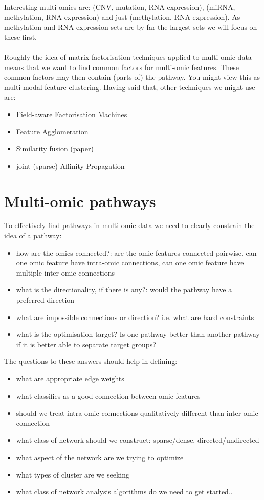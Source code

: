 \documentclass[a4paper,10pt]{article}
\begin{document}
Interesting multi-omics are: (CNV, mutation, RNA expression), (miRNA, methylation, RNA expression) and just (methylation, RNA expression).
As methylation and RNA expression sets are by far the largest sets we will focus on these first. \\ \\
%
Roughly the idea of matrix factorisation techniques applied to multi-omic data means that we want to find
common factors for multi-omic features. These common factors may then contain (parts of) the pathway. 
You might view this as multi-modal feature clustering. Having said that, other techniques we might use are:
\begin{itemize}
\item Field-aware Factorisation Machines
\item Feature Agglomeration
\item Similarity fusion (\href{https://www.researchgate.net/publication/221299518_Unifying_user-based_and_item-based_collaborative_filtering_approaches_by_similarity_fusion}{paper})
\item joint (sparse) Affinity Propagation
\end{itemize}

\section{Multi-omic pathways}
%
To effectively find pathways in multi-omic data we need to clearly constrain the idea of a pathway:
\begin{itemize}
 \item how are the omics connected?: are the omic features connected pairwise, can one omic feature have intra-omic connections, can one omic feature have multiple inter-omic connections
 \item what is the directionality, if there is any?: would the pathway have a preferred direction
 \item what are impossible connections or direction? i.e. what are hard constraints
 \item what is the optimisation target? Is one pathway better than another pathway if it is better able to separate target groups?
\end{itemize}
%

The questions to these answers should help in defining:
\begin{itemize}
 \item what are appropriate edge weights
 \item what classifies as a good connection between omic features
 \item should we treat intra-omic connections qualitatively different than inter-omic connection
 \item what class of network should we construct: sparse/dense, directed/undirected
 \item what aspect of the network are we trying to optimize
 \item what types of cluster are we seeking
 \item what class of network analysis algorithms do we need to get started..
\end{itemize}
\end{document}
